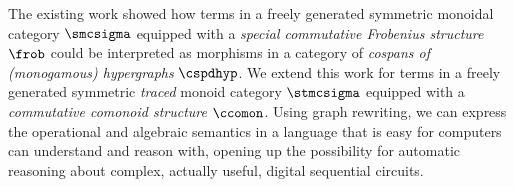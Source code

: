 The existing work showed how terms in a freely generated symmetric monoidal
category \(\smcsigma\) equipped with a
\emph{special commutative Frobenius structure} \(\frob\) could be interpreted as
morphisms in a category of
\emph{cospans of (monogamous) hypergraphs} \(\cspdhyp\).
We extend this work for terms in a freely generated symmetric \emph{traced}
monoid category \(\stmcsigma\) equipped with a
\emph{commutative comonoid structure} \(\ccomon\).
Using graph rewriting, we can express the operational and algebraic semantics
in a language that is easy for computers can understand and reason with, opening
up the possibility for automatic reasoning about complex, actually useful,
digital sequential circuits.
